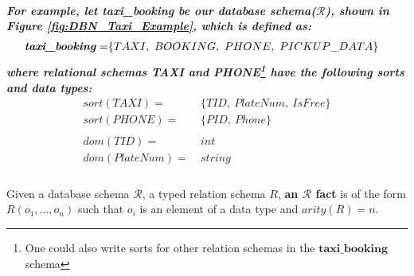 \subparagraph*{\textnormal{For example, let \textbf{\textit{taxi\_booking}} be our database schema($\mathcal{R}$), shown in Figure \ref{fig:DBN_Taxi_Example}, which is defined as:
		\begin{equation*}
		\begin{aligned}
		\textbf{\textit{taxi\_booking}} =& \{TAXI,\ BOOKING,\ PHONE,\ PICKUP\_DATA\}
		\end{aligned}
		\end{equation*}
		where relational schemas TAXI and PHONE\footnote{One could also write sorts for other relation schemas in the $\textbf{taxi\_booking}$ schema} have the following sorts and data types:
		\begin{equation*}
		\begin{aligned}
		sort(TAXI) = & \{TID,\ PlateNum,\ IsFree\}\\
		sort(PHONE)= & \{PID,\ Phone\}\\\\
		dom(TID) =\ & int\\
		dom(PlateNum)=\ & string
		\end{aligned}
		\end{equation*}
}}

\begin{defs}
	\label{defs:dbn_rfacts}
	Given a database schema $\mathit{\mathcal{R}}$, a typed relation schema $\mathit{R}$, \textbf{an $\mathit{\mathcal{R}}$ fact} is of the form $\mathit{R(o_{1},\ldots,o_{n})}$ such that $\mathit{o_{i}}$ is an element of a data type and $\mathit{arity(R) = n}$.
\end{defs}

